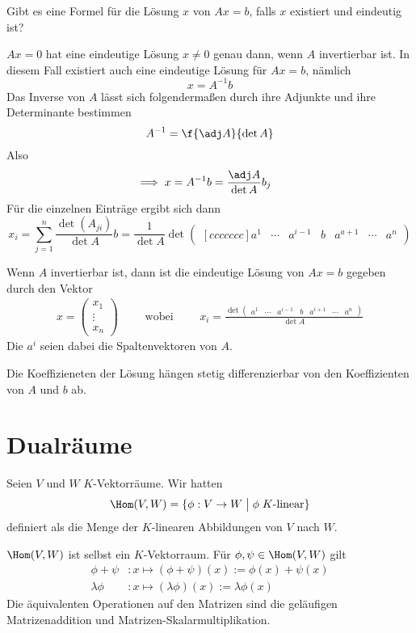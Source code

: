 \documentclass{mycourse}
\begin{document}
Gibt es eine Formel für die Lösung $x$ von $Ax=b$, falls $x$ existiert und eindeutig ist?

$Ax=0$ hat eine eindeutige Lösung $x\neq 0$ genau dann, wenn $A$ invertierbar ist.
In diesem Fall existiert auch eine eindeutige Lösung für $Ax=b$, nämlich
\[
	x=A^{-1}b
\]
Das Inverse von $A$ lässt sich folgendermaßen durch ihre Adjunkte und ihre Determinante bestimmen
\[
	A^{-1} = \f{\adj A}{\det A}
\]
Also
\begin{align*}
\implies x=A^{-1}b&=\frac{\adj A}{\det A}b_j
\end{align*}
Für die einzelnen Einträge ergibt sich dann
\[
x_i
=\sum_{j=1}^n\frac{\det(A_{ji})}{\det A}b
=\frac 1{\det A}\det\begin{pmatrix}[ccccccc]a^1&\cdots&a^{i-1}&b&a^{a+1}&\cdots&a^n\end{pmatrix}
\]
\begin{kor} \label{kor: 8.15}
Wenn $A$ invertierbar ist, dann ist die eindeutige Lösung von $Ax=b$ gegeben durch den Vektor
\begin{align*}
x=\begin{pmatrix}x_1\\ \vdots \\ x_n\end{pmatrix} \qquad \text{ wobei }\qquad
x_i=\frac{
\det\begin{pmatrix}
a^1 & \cdots & a^{i-1} & b & a^{i+1} & \cdots & a^n
\end{pmatrix}
}{\det A}
\end{align*}
Die $a^i$ seien dabei die Spaltenvektoren von $A$.\end{kor}
\begin{note}[Konsequenz]
Die Koeffizieneten der Lösung hängen stetig differenzierbar von den Koeffizienten von $A$ und $b$ ab. 
\end{note}




\chapter{Dualräume}

Seien $V$ und $W$ $K$-Vektorräume. 
Wir hatten
\[
	\Hom(V,W)=\{\phi:V\to W \;\big|\; \phi\; K\text{-linear}\}
\]
definiert als die Menge der $K$-linearen Abbildungen von $V$ nach $W$.

$\Hom(V,W)$ ist selbst ein $K$-Vektorraum. Für $\phi,\psi\in \Hom(V,W)$ gilt
\begin{align*}
\phi+\psi&:x\mapsto (\phi+\psi)(x):=\phi(x)+\psi(x)\\
\lambda\phi&:x\mapsto (\lambda\phi)(x):=\lambda\phi(x)
\end{align*}
Die äquivalenten Operationen auf den Matrizen sind die geläufigen Matrizenaddition und Matrizen-Skalarmultiplikation.
\end{document}
